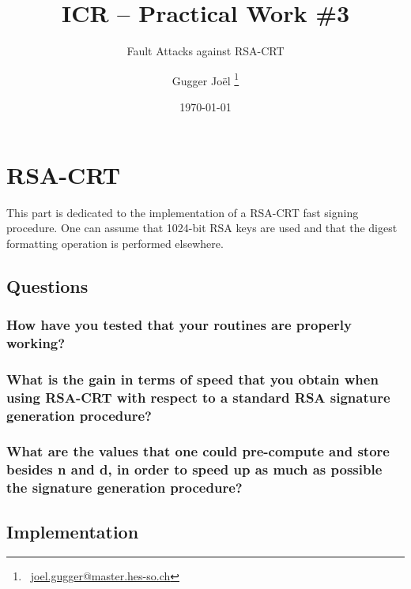 \documentclass[a4paper]{report}
\title{ICR -- Practical Work \#3}
\subtitle{Fault Attacks against RSA-CRT}
\author{Gugger Joël \thanks{\ \href{mailto:joel.gugger@master.hes-so.ch}{joel.gugger@master.hes-so.ch}}}
\date{\today}
\begin{document}
 
\maketitle


\tableofcontents

 
\chapter{RSA-CRT}
This part is dedicated to the implementation of a RSA-CRT fast signing procedure. One can assume that 1024-bit RSA keys are used and that the digest formatting operation is performed elsewhere.

\section{Questions}
\subsection{How have you tested that your routines are properly working?}

\subsection{What is the gain in terms of speed that you obtain when using RSA-CRT with respect to a standard RSA signature generation procedure?}

\subsection{What are the values that one could pre-compute and store besides n and d, in order to speed up as much as possible the signature generation procedure?}


\section{Implementation}
\end{document}
